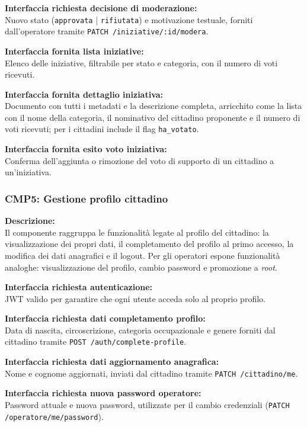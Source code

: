 \documentclass[12pt, a4paper]{article}
\newcommand{\interfacciarichiesta}[1]{\textbf{Interfaccia richiesta #1:}}
\newcommand{\interfacciafornita}[1]{\textbf{Interfaccia fornita #1:}}
\begin{document}
\interfacciarichiesta{decisione di moderazione}\\
Nuovo stato (\texttt{approvata} | \texttt{rifiutata}) e motivazione testuale, forniti
dall'operatore tramite \texttt{PATCH /iniziative/:id/modera}.

\interfacciafornita{lista iniziative}\\
Elenco delle iniziative, filtrabile per stato e categoria, con il numero di voti ricevuti.

\interfacciafornita{dettaglio iniziativa}\\
Documento con tutti i metadati e la descrizione completa, arricchito come la lista con il nome
della categoria, il nominativo del cittadino proponente e il numero di voti ricevuti; per i
cittadini include il flag \texttt{ha\_votato}.

\interfacciafornita{esito voto iniziativa}\\
Conferma dell'aggiunta o rimozione del voto di supporto di un cittadino a un'iniziativa.

\subsubsection*{CMP5: Gestione profilo cittadino}

\textbf{Descrizione:}\\
Il componente raggruppa le funzionalità legate al profilo del cittadino: la visualizzazione dei
propri dati, il completamento del profilo al primo accesso, la modifica dei dati anagrafici e il
logout. Per gli operatori espone funzionalità analoghe: visualizzazione del profilo, cambio
password e promozione a \textit{root}.

\interfacciarichiesta{autenticazione}\\
JWT valido per garantire che ogni utente acceda solo al proprio profilo.

\interfacciarichiesta{dati completamento profilo}\\
Data di nascita, circoscrizione, categoria occupazionale e genere forniti dal cittadino tramite
\texttt{POST /auth/complete-profile}.

\interfacciarichiesta{dati aggiornamento anagrafica}\\
Nome e cognome aggiornati, inviati dal cittadino tramite \texttt{PATCH /cittadino/me}.

\interfacciarichiesta{nuova password operatore}\\
Password attuale e nuova password, utilizzate per il cambio credenziali
(\texttt{PATCH /operatore/me/password}).
\end{document}
